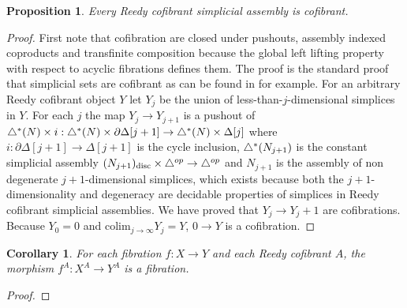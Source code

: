 \documentclass{amsart}
\theoremstyle{plain}
\newtheorem{prop}[theorem]{Proposition}
\newtheorem{corol}[theorem]{Corollary}
\theoremstyle{definition}
\newcommand\ri{^*}
\begin{document}
{\begin{prop} Every Reedy cofibrant simplicial assembly is cofibrant. \end{prop}

\begin{proof} First note that cofibration are closed under pushouts, assembly indexed coproducts and transfinite composition because the global left lifting property with respect to acyclic fibrations defines them. The proof is the standard proof that simplicial sets are cofibrant as can be found in \cite{Hovey99} for example. For an arbitrary Reedy cofibrant object $Y$ let $Y_j$ be the union of less-than-$j$-dimensional simplices in $Y$. For each $j$ the map $Y_j\to Y_{j+1}$ is a pushout of $\simcat\ri(N)\times i:\simcat\ri(N)\times\partial\Delta[j+1]\to \simcat\ri(N)\times\Delta[j]$ where $i:\partial\Delta[j+1]\to \Delta[j+1]$ is the cycle inclusion, $\simcat\ri(N_{j+1})$ is the constant simplicial assembly $(N_{j+1})_{\rm disc}\times {\mathord{\triangle}}^{op}\to{\mathord{\triangle}}^{op}$ and $N_{j+1}$ is the assembly of non degenerate $j+1$-dimensional simplices, which exists because both the $j+1$-dimensionality and degeneracy are decidable properties of simplices in Reedy cofibrant simplicial assemblies. We have proved that $Y_j\to Y_j+1$ are cofibrations. Because $Y_0 = 0$ and $\mathrm{colim}_{j\to\infty} Y_j=Y$, $0\to Y$ is a cofibration.
\end{proof}

\begin{corol} For each fibration $f:X\to Y$ and each Reedy cofibrant $A$, the morphism $f^A: X^A\to Y^A$ is a fibration. \end{corol}

\begin{proof} 

\end{proof}
}
\end{document}
